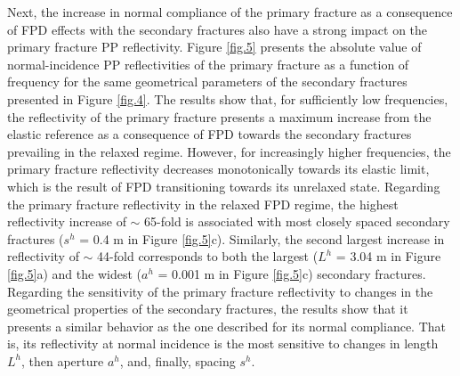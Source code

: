 \documentclass[draft]{agujournal2019}
\begin{document}
Next, the increase in normal compliance of the primary fracture as a consequence of FPD effects with the secondary fractures also have a strong impact on the primary fracture PP reflectivity. Figure \ref{fig.5} presents the absolute value of normal-incidence PP reflectivities of the primary fracture as a function of frequency for the same geometrical parameters of the secondary fractures presented in Figure \ref{fig.4}.
The results show that, for sufficiently low frequencies, the reflectivity of the primary fracture presents a maximum increase from the elastic reference as a consequence of FPD towards the secondary fractures prevailing in the relaxed regime. However, for increasingly higher frequencies, the primary fracture reflectivity  decreases monotonically towards its elastic limit, which is the result of FPD transitioning towards its unrelaxed state. Regarding the primary fracture reflectivity in the relaxed FPD regime, the highest reflectivity increase of $\sim$ 65-fold is associated with most closely spaced secondary fractures ($s^h$ = 0.4 m in Figure \ref{fig.5}c). Similarly, the second largest increase in reflectivity of $\sim$ 44-fold corresponds to both the largest ($L^h$ = 3.04 m in Figure \ref{fig.5}a) and the widest ($a^h$ = 0.001 m in Figure \ref{fig.5}c) secondary fractures.
Regarding the sensitivity of the primary fracture reflectivity to changes in the geometrical properties of the secondary fractures, the results show that it presents a similar behavior as the one described for its normal compliance. 
That is, its reflectivity at normal incidence is the most sensitive to changes in length $L^h$, then aperture $a^h$, and, finally, spacing $s^h$. 
\end{document}
